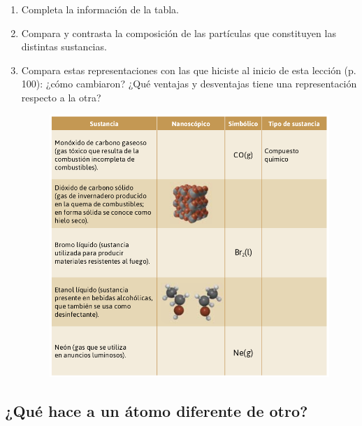 \documentclass[11pt]{book}
\begin{document}
\newpage
\begin{boxK}
  \begin{enumerate}
    \item Completa la información de la tabla.
    \item Compara y contrasta la composición de las partículas que constituyen las distintas sustancias.
    \item Compara estas representaciones con las que hiciste al inicio de esta lección
          (p. 100): ¿cómo cambiaron? ¿Qué ventajas y desventajas tiene una representación respecto a la otra?
          \begin{figure}[H]
            \centering
            \includegraphics[width=.8\textwidth]{tabla02.png}
          \end{figure}

  \end{enumerate}
\end{boxK}

\newpage
\subsection{¿Qué hace a un átomo diferente de otro?}
\end{document}
